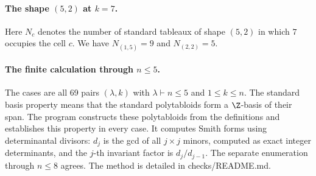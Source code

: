\paragraph{The shape $(5,2)$ at $k=7$.}
Here $N_c$ denotes the number of standard tableaux of shape $(5,2)$ in
which $7$ occupies the cell $c$. We have $N_{(1,5)}=9$ and $N_{(2,2)}=5$.

\paragraph{The finite calculation through $n\le5$.}
The cases are all 69 pairs $(\lambda,k)$ with $\lambda\vdash n\le5$ and $1\le k\le n$. The standard basis property means that the standard polytabloids form a $\Z$-basis of their span. The program constructs these polytabloids from the definitions and establishes this property in every case. It computes Smith forms using determinantal divisors: $d_j$ is the gcd of all $j\times j$ minors, computed as exact integer determinants, and the $j$-th invariant factor is $d_j/d_{j-1}$. The separate enumeration through $n\le8$ agrees. The method is detailed in checks/README.md.
